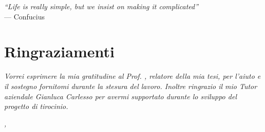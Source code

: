 \cleardoublepage
{}
{}

\begin{flushright}{
    \slshape
    ``Life is really simple, but we insist on making it complicated''} \\
    \medskip
    --- Confucius
\end{flushright}


\bigskip

\begingroup
\let\clearpage\relax
\let\cleardoublepage\relax
\let\cleardoublepage\relax

\chapter*{Ringraziamenti}

\noindent \textit{Vorrei esprimere la mia gratitudine al Prof. \myProf, relatore della mia tesi, per l'aiuto e il sostegno fornitomi durante la stesura del lavoro. 
Inoltre ringrazio il mio Tutor aziendale Gianluca Carlesso per avermi supportato durante lo sviluppo del progetto di tirocinio.}\\

\bigskip

\noindent\textit{\myLocation, \myTime}
\hfill \myName

\endgroup
